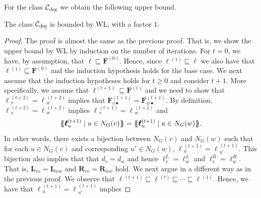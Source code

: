 For the class ${\cal C}_{\textsl{deg}}$ we obtain the following upper bound.
\begin{proposition}\label{prop:boundnonconstantR}
	The class ${\cal C}_{\textsl{deg}}$ is bounded by WL, with a factor $1$.	
%
\end{proposition}
\begin{proof}
The proof is almost the same as the previous proof. That is,
we show the upper bound by WL by induction on the number of iterations. For $t=0$, we have, by assumption, that 
$\pmb{\ell}\sqsubseteq \mathbf{F}^{(0)}$. Hence, since $\pmb{\ell}{}^{(1)}\sqsubseteq\pmb{\ell}$ we also have that $\pmb{\ell}{}^{(1)}\sqsubseteq\mathbf{F}^{(0)}$ and 
the induction hypothesis holds for the base case.
%
 We next assume that the induction hypotheses holds for $t\geq 0$ and consider $t+1$. More specifically, we assume that 
 $\pmb{\ell}^{(t+1)}\sqsubseteq \mathbf{F}^{(t)}$ and
we need to show that 
$\pmb{\ell}{}^{(t+2)}_v=\pmb{\ell}{}^{(t+2)}_w$ implies that $\mathbf{F}^{(t+1)}_{v\bullet}=\mathbf{F}^{(t+1)}_{w\bullet}$. By definition,
$\pmb{\ell}{}^{(t+2)}_v=\pmb{\ell}{}^{(t+2)}_w$ implies
$\pmb{\ell}{}^{(t+1)}_v=\pmb{\ell}{}^{(t+1)}_w$ and 
$$
\ldbl \pmb{\ell}{}^{(t+1)}_u \st u \in N_G(v) \rdbl=
 \ldbl \pmb{\ell}{}^{(t+1)}_u \st u \in N_G(w) \rdbl.$$
 In other words, there exists a bijection between $N_G(v)$ and $N_G(w)$ such that for each $u\in N_G(v)$ and corresponding $u'\in N_G(w)$, $\pmb{\ell}{}^{(t+1)}_u=\pmb{\ell}{}^{(t+1)}_{u'}$. 
  This bijection also implies that
 that $d_v=d_w$ and hence $\pmb{\ell}^L_{v}=\pmb{\ell}^L_{w}$ and $\pmb{\ell}^{R}_{v}=\pmb{\ell}^R_{w}$. That is,
 $\mathbf{L}_{vv}=\mathbf{L}_{ww}$ and $\mathbf{R}_{vv}=\mathbf{R}_{ww}$ hold.
We next argue in a different way as in the previous proof. We observe that
 $\pmb{\ell}{}^{(t+1)}\sqsubseteq \pmb{\ell}{}^{(t)}\sqsubseteq \cdots\sqsubseteq \pmb{\ell}{}^{(1)}$. Hence, we have that $\pmb{\ell}{}^{(t+1)}_u=\pmb{\ell}{}^{(t+1)}_{u'}$ implies 

\end{proof}
